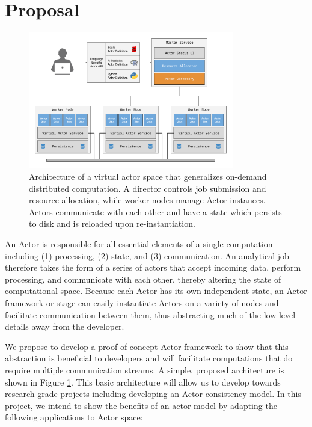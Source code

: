 \documentclass[11pt,letterpaper]{article}
\begin{document}
\section*{Proposal}

\begin{figure}[t]
	\centering
    \includegraphics[width=0.8\textwidth]{figures/architecture.png}
    \caption{\textsf{Architecture of a virtual actor space that generalizes on-demand distributed computation. A director controls job submission and resource allocation, while worker nodes manage Actor instances. Actors communicate with each other and have a state which persists to disk and is reloaded upon re-instantiation.}}
    \label{fig:architecture}
\end{figure}

An Actor is responsible for all essential elements of a single computation including (1) processing, (2) state, and (3) communication. An analytical job therefore takes the form of a series of actors that accept incoming data, perform processing, and communicate with each other, thereby altering the state of computational space. Because each Actor has its own independent state, an Actor framework or stage can easily instantiate Actors on a variety of nodes and facilitate communication between them, thus abstracting much of the low level details away from the developer.

We propose to develop a proof of concept Actor framework to show that this abstraction is beneficial to developers and will facilitate computations that do require multiple communication streams. A simple, proposed architecture is shown in Figure \ref{fig:architecture}. This basic architecture will allow us to develop towards research grade projects including developing an Actor consistency model. In this project, we intend to show the benefits of an actor model by adapting the following applications to Actor space:
\end{document}
